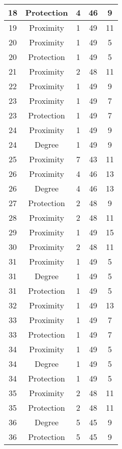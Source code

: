 \documentclass[results.tex]{subfiles}
\begin{document}
\begin{center}
\begin{tabular}{| c || c | c | c | c |}
    \hline
    18 & Protection & 4 & 46 & 9 \\ 
    \hline
    19 & Proximity & 1 & 49 & 11 \\ 
    \hline
    20 & Proximity & 1 & 49 & 5 \\ 
    \hline
    20 & Protection & 1 & 49 & 5 \\ 
    \hline
    21 & Proximity & 2 & 48 & 11 \\ 
    \hline
    22 & Proximity & 1 & 49 & 9 \\ 
    \hline
    23 & Proximity & 1 & 49 & 7 \\ 
    \hline
    23 & Protection & 1 & 49 & 7 \\ 
    \hline
    24 & Proximity & 1 & 49 & 9 \\ 
    \hline
    24 & Degree & 1 & 49 & 9 \\ 
    \hline
    25 & Proximity & 7 & 43 & 11 \\ 
    \hline
    26 & Proximity & 4 & 46 & 13 \\ 
    \hline
    26 & Degree & 4 & 46 & 13 \\ 
    \hline
    27 & Protection & 2 & 48 & 9 \\ 
    \hline
    28 & Proximity & 2 & 48 & 11 \\ 
    \hline
    29 & Proximity & 1 & 49 & 15 \\ 
    \hline
    30 & Proximity & 2 & 48 & 11 \\ 
    \hline
    31 & Proximity & 1 & 49 & 5 \\ 
    \hline
    31 & Degree & 1 & 49 & 5 \\ 
    \hline
    31 & Protection & 1 & 49 & 5 \\ 
    \hline
    32 & Proximity & 1 & 49 & 13 \\ 
    \hline
    33 & Proximity & 1 & 49 & 7 \\ 
    \hline
    33 & Protection & 1 & 49 & 7 \\ 
    \hline
    34 & Proximity & 1 & 49 & 5 \\ 
    \hline
    34 & Degree & 1 & 49 & 5 \\ 
    \hline
    34 & Protection & 1 & 49 & 5 \\ 
    \hline
    35 & Proximity & 2 & 48 & 11 \\ 
    \hline
    35 & Protection & 2 & 48 & 11 \\ 
    \hline
    36 & Degree & 5 & 45 & 9 \\ 
    \hline
    36 & Protection & 5 & 45 & 9 \\ 

\end{tabular}
\end{center}
\end{document}

